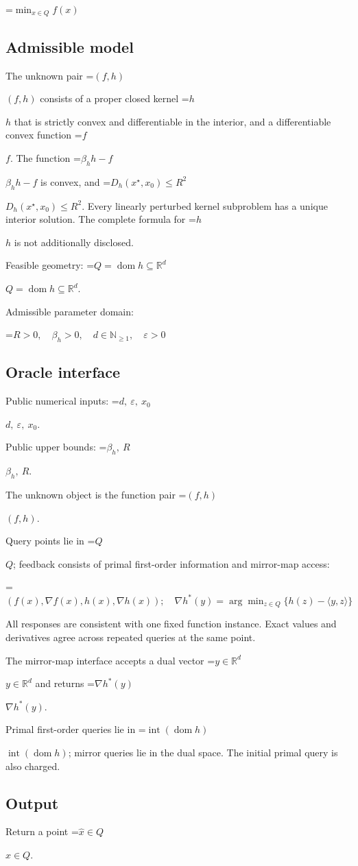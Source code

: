 \documentclass[10pt,a4paper]{article}
\newcommand{\AtlasMath}[1]{\par\begingroup\centering\setbox0=\hbox{$\displaystyle #1$}\ifdim\wd0>1.4\linewidth\typeout{ATLAS WIDE FORMULA: \the\wd0}\fi\ifdim\wd0>\linewidth\resizebox{\linewidth}{!}{\box0}\else\box0\fi\par\endgroup}
\newcommand{\AtlasInlineMath}[1]{\begingroup\setbox0=\hbox{$#1$}\ifdim\wd0>.4\linewidth\endgroup\AtlasMath{#1}\else\endgroup$#1$\fi}
\begin{document}
\AtlasMath{\min_{x\in Q}f(x)}


\subsection{Admissible model}
The unknown pair \AtlasInlineMath{(f,h)} consists of a proper closed kernel \AtlasInlineMath{h} that is strictly convex and differentiable in the interior, and a differentiable convex function \AtlasInlineMath{f}. The function \AtlasInlineMath{\beta_hh-f} is convex, and \AtlasInlineMath{D_h(x^\star,x_0)\le R^2}. Every linearly perturbed kernel subproblem has a unique interior solution. The complete formula for \AtlasInlineMath{h} is not additionally disclosed.

Feasible geometry: \AtlasInlineMath{Q=\operatorname{dom}h\subseteq\mathbb{R}^d}.

Admissible parameter domain:


\AtlasMath{R>0,\quad \beta_h>0,\quad d\in\mathbb{N}_{\ge1},\quad \varepsilon>0}


\subsection{Oracle interface}
Public numerical inputs: \AtlasInlineMath{d,\ \varepsilon,\ x_0}.

Public upper bounds: \AtlasInlineMath{\beta_h,\ R}.

The unknown object is the function pair \AtlasInlineMath{(f,h)}.

Query points lie in \AtlasInlineMath{Q}; feedback consists of primal first-order information and mirror-map access:


\AtlasMath{(f(x),\nabla f(x),h(x),\nabla h(x));\quad\nabla h^*(y)=\arg\min_{z\in Q}\{h(z)-\langle y,z\rangle\}}


All responses are consistent with one fixed function instance. Exact values and derivatives agree across repeated queries at the same point.

The mirror-map interface accepts a dual vector \AtlasInlineMath{y\in\mathbb R^d} and returns \AtlasInlineMath{\nabla h^*(y)}.

Primal first-order queries lie in \AtlasInlineMath{\operatorname{int}(\operatorname{dom}h)}; mirror queries lie in the dual space. The initial primal query is also charged.

\subsection{Output}
Return a point \AtlasInlineMath{\widehat x\in Q}.
\end{document}
